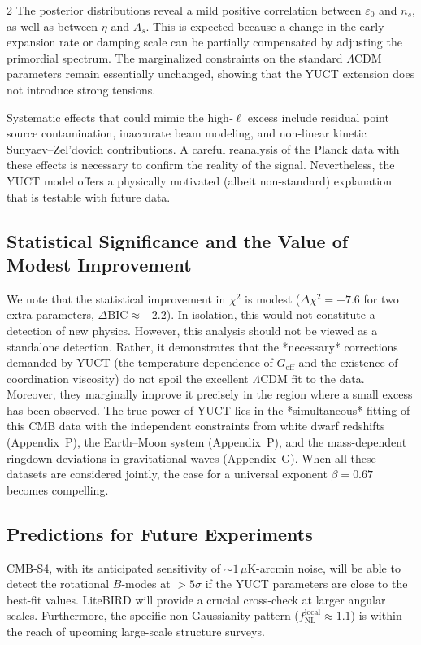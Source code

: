 \documentclass[11pt,a4paper]{article}
\begin{document}
\begin{multicols}{2}
		The posterior distributions reveal a mild positive correlation between $\varepsilon_0$ and $n_s$, as well as between $\eta$ and $A_s$. This is expected because a change in the early expansion rate or damping scale can be partially compensated by adjusting the primordial spectrum. The marginalized constraints on the standard $\Lambda$CDM parameters remain essentially unchanged, showing that the YUCT extension does not introduce strong tensions.
		
		Systematic effects that could mimic the high‑$\ell$ excess include residual point source contamination, inaccurate beam modeling, and non‑linear kinetic Sunyaev--Zel'dovich contributions. A careful reanalysis of the Planck data with these effects is necessary to confirm the reality of the signal. Nevertheless, the YUCT model offers a physically motivated (albeit non‑standard) explanation that is testable with future data.
		
		\subsection{Statistical Significance and the Value of Modest Improvement}
		
		We note that the statistical improvement in $\chi^2$ is modest ($\Delta\chi^2 = -7.6$ for two extra parameters, $\Delta\mathrm{BIC} \approx -2.2$). In isolation, this would not constitute a detection of new physics. However, this analysis should not be viewed as a standalone detection. Rather, it demonstrates that the *necessary* corrections demanded by YUCT (the temperature dependence of $G_{\mathrm{eff}}$ and the existence of coordination viscosity) do not spoil the excellent $\Lambda$CDM fit to the data. Moreover, they marginally improve it precisely in the region where a small excess has been observed. The true power of YUCT lies in the *simultaneous* fitting of this CMB data with the independent constraints from white dwarf redshifts (Appendix~P), the Earth--Moon system (Appendix~P), and the mass-dependent ringdown deviations in gravitational waves (Appendix~G). When all these datasets are considered jointly, the case for a universal exponent $\beta=0.67$ becomes compelling.
		
		\subsection{Predictions for Future Experiments}
		
		CMB‑S4, with its anticipated sensitivity of $\sim 1\,\mu$K-arcmin noise, will be able to detect the rotational $B$‑modes at $>5\sigma$ if the YUCT parameters are close to the best‑fit values. LiteBIRD will provide a crucial cross‑check at larger angular scales. Furthermore, the specific non‑Gaussianity pattern ($f_{\mathrm{NL}}^{\mathrm{local}} \approx 1.1$) is within the reach of upcoming large-scale structure surveys.
		

\end{multicols}
\end{document}
